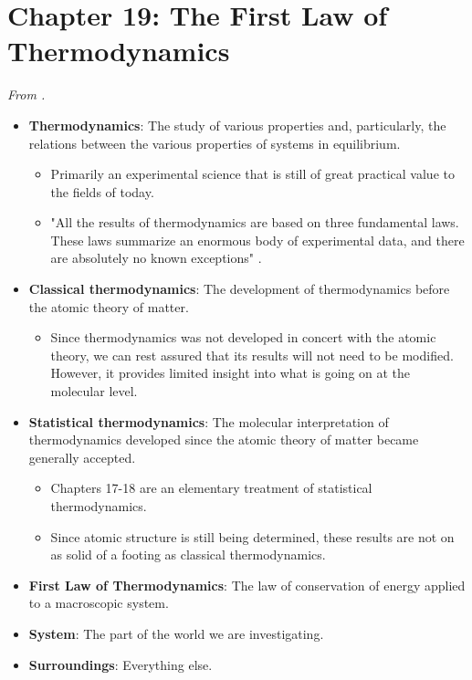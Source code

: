 \documentclass[../notes.tex]{subfiles}
\begin{document}
\section{Chapter 19: The First Law of Thermodynamics}
\emph{From \textcite{bib:McQuarrieSimon}.}
\begin{itemize}
    \item {}\textbf{Thermodynamics}: The study of various properties and, particularly, the relations between the various properties of systems in equilibrium.
    \begin{itemize}
        \item Primarily an experimental science that is still of great practical value to the fields of today.
        \item "All the results of thermodynamics are based on three fundamental laws. These laws summarize an enormous body of experimental data, and there are absolutely no known exceptions" \parencite[765]{bib:McQuarrieSimon}.
    \end{itemize}
    \item \textbf{Classical thermodynamics}: The development of thermodynamics before the atomic theory of matter.
    \begin{itemize}
        \item Since thermodynamics was not developed in concert with the atomic theory, we can rest assured that its results will not need to be modified. However, it provides limited insight into what is going on at the molecular level.
    \end{itemize}
    \item \textbf{Statistical thermodynamics}: The molecular interpretation of thermodynamics developed since the atomic theory of matter became generally accepted.
    \begin{itemize}
        \item Chapters 17-18 are an elementary treatment of statistical thermodynamics.
        \item Since atomic structure is still being determined, these results are not on as solid of a footing as classical thermodynamics.
    \end{itemize}
    \item \textbf{First Law of Thermodynamics}: The law of conservation of energy applied to a macroscopic system.
    \item \textbf{System}: The part of the world we are investigating.
    \item \textbf{Surroundings}: Everything else.

\end{itemize}
\end{document}
